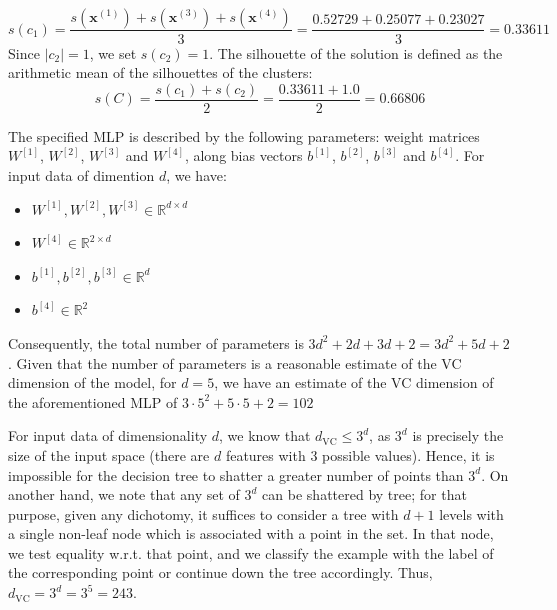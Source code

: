 \documentclass{exam}
\begin{document}
\begin{questions}
\begin{align*}
            \end{align*}
            \vspace{-2.2em}
            \[
                s(c_1) = \frac{ s(\textbf{x}^{(1)}) +  s(\textbf{x}^{(3)}) +  s(\textbf{x}^{(4)})}{3} = \frac{0.52729 + 0.25077 + 0.23027}{3} = 0.33611
            \]
            Since $|c_2| = 1$, we set $s(c_2) = 1$. The  silhouette of the solution is defined as the arithmetic mean of the silhouettes of the clusters:
            \vspace{1em}
            \[
                s(C) = \frac{s(c_1) + s(c_2)}{2} = \frac{0.33611 + 1.0}{2} = 0.66806
            \]
        \item \quad
        \begin{parts}
            \item \vspace{-1.6em}
            \begin{subparts}
                \item The specified MLP is described by the following parameters: weight matrices $W^{[1]}$, $W^{[2]}$, $W^{[3]}$ and $W^{[4]}$, along bias vectors $b^{[1]}$, $b^{[2]}$, $b^{[3]}$ and $b^{[4]}$. For input data of dimention $d$, we have:
                \begin{itemize}
                    \item $W^{[1]}, W^{[2]}, W^{[3]} \in \mathbb{R}^{d \times d}$
                    \item $W^{[4]} \in \mathbb{R}^{2 \times d}$
                    \item $b^{[1]}, b^{[2]}, b^{[3]} \in \mathbb{R}^{d}$
                    \item $b^{[4]} \in \mathbb{R}^{2}$
                \end{itemize} 
                Consequently, the total number of parameters is $3d^2 + 2d + 3d + 2 = 3d^2 + 5d + 2$. Given that the number of parameters is a reasonable estimate of the VC dimension of the model, for $d = 5$, we have an estimate of the VC dimension of the aforementioned MLP of $3 \cdot 5^2 + 5 \cdot 5 + 2 = 102$
                \item For input data of dimensionality $d$, we know that $d_{\text{VC}} \le 3^d$, as $3^d$ is precisely the size of the input space (there are $d$ features with 3 possible values). Hence, it is impossible for the decision tree to shatter a greater number of points than $3^d$. On another hand, we note that any set of $3^d$ can be shattered by tree; for that purpose, given any dichotomy, it suffices to consider a tree with $d + 1$ levels with a single non-leaf node which is associated with a point in the set. In that node, we test equality w.r.t. that point, and we classify the example with the label of the corresponding point or continue down the tree accordingly. Thus, $d_{\text{VC}} = 3^d = 3^5 = 243$.

\end{subparts}
\end{parts}
\end{questions}
\end{document}
